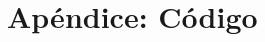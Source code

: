 \documentclass[10pt, a4paper]{article}
\begin{document}
\section{Apéndice: Código}





\end{document}
